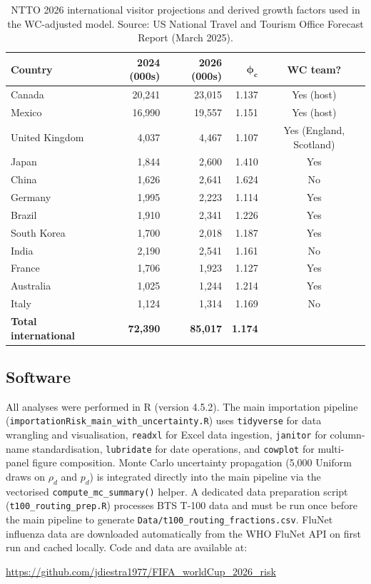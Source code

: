 \documentclass[12pt]{article}
\begin{document}
\begin{table}[h!]
\centering
\caption{NTTO 2026 international visitor projections and derived
  growth factors used in the WC-adjusted model. Source:
  US National Travel and Tourism Office Forecast Report
  (March 2025).}
\label{tab:ntto}
\small
\begin{tabular}{lrrrc}
\toprule
\textbf{Country} & \textbf{2024 (000s)} & \textbf{2026 (000s)}
  & $\boldsymbol{\phi_c}$ & \textbf{WC team?} \\
\midrule
Canada         & 20,241 & 23,015 & 1.137 & Yes (host) \\
Mexico         & 16,990 & 19,557 & 1.151 & Yes (host) \\
United Kingdom & 4,037  & 4,467  & 1.107 & Yes (England, Scotland) \\
Japan          & 1,844  & 2,600  & 1.410 & Yes \\
China          & 1,626  & 2,641  & 1.624 & No \\
Germany        & 1,995  & 2,223  & 1.114 & Yes \\
Brazil         & 1,910  & 2,341  & 1.226 & Yes \\
South Korea    & 1,700  & 2,018  & 1.187 & Yes \\
India          & 2,190  & 2,541  & 1.161 & No \\
France         & 1,706  & 1,923  & 1.127 & Yes \\
Australia      & 1,025  & 1,244  & 1.214 & Yes \\
Italy          & 1,124  & 1,314  & 1.169 & No \\
\midrule
\textbf{Total international} & \textbf{72,390} & \textbf{85,017}
  & \textbf{1.174} & \\
\bottomrule
\end{tabular}
\end{table}

\subsection*{Software}

All analyses were performed in R (version 4.5.2). The main
importation pipeline
(\texttt{importationRisk\_main\_with\_uncertainty.R}) uses
\texttt{tidyverse} for data wrangling and visualisation,
\texttt{readxl} for Excel data ingestion, \texttt{janitor} for
column-name standardisation, \texttt{lubridate} for date operations,
and \texttt{cowplot} for multi-panel figure composition. Monte Carlo
uncertainty propagation (5,000 Uniform draws on $\rho_d$ and $p_d$)
is integrated directly into the main pipeline via the vectorised
\texttt{compute\_mc\_summary()} helper. A dedicated data preparation
script (\texttt{t100\_routing\_prep.R}) processes BTS T-100 data and
must be run once before the main pipeline to generate
\texttt{Data/t100\_routing\_fractions.csv}. FluNet influenza data are
downloaded automatically from the WHO FluNet API on first run and
cached locally.
Code and data are available at:
{\sloppy\begin{center}
\small\url{https://github.com/jdiestra1977/FIFA_worldCup_2026_risk}
\end{center}}
\end{document}
